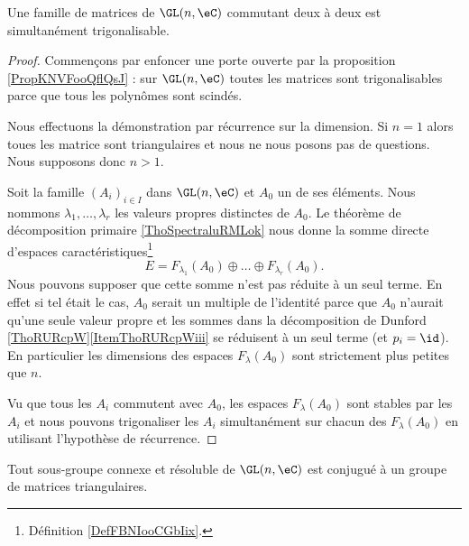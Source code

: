 \begin{lemma}   \label{LemSLGPooIghEPI}
    Une famille de matrices de \( \GL(n,\eC)\) commutant deux à deux est simultanément trigonalisable.
\end{lemma}

\begin{proof}
    Commençons par enfoncer une porte ouverte par la proposition \ref{PropKNVFooQflQsJ} : sur \( \GL(n,\eC)\) toutes les matrices sont trigonalisables parce que tous les polynômes sont scindés.

    Nous effectuons la démonstration par récurrence sur la dimension. Si \( n=1\) alors toues les matrice sont triangulaires et nous ne nous posons pas de questions. Nous supposons donc \( n>1\).

    Soit la famille \( (A_i)_{i\in I}\) dans \( \GL(n,\eC)\) et \( A_0\) un de ses éléments. Nous nommons \( \lambda_1,\ldots, \lambda_r\) les valeurs propres distinctes de \( A_0\). Le théorème de décomposition primaire \ref{ThoSpectraluRMLok} nous donne la somme directe d'espaces caractéristiques\footnote{Définition \ref{DefFBNIooCGbIix}.}
    \begin{equation}
        E=F_{\lambda_1}(A_0)\oplus\ldots\oplus F_{\lambda_r}(A_0).
    \end{equation}
    Nous pouvons supposer que cette somme n'est pas réduite à un seul terme. En effet si tel était le cas, \( A_0\) serait un multiple de l'identité parce que \( A_0\) n'aurait qu'une seule valeur propre et les sommes dans la décomposition de Dunford \ref{ThoRURcpW}\ref{ItemThoRURcpWiii} se réduisent à un seul terme (et \( p_i=\id\)). En particulier les dimensions des espaces \( F_{\lambda}(A_0)\) sont strictement plus petites que \( n\).

    Vu que tous les \( A_i\) commutent avec \( A_0\), les espaces \( F_{\lambda}(A_0)\) sont stables par les \( A_i\) et nous pouvons trigonaliser les \( A_i\) simultanément sur chacun des \( F_{\lambda}(A_0)\) en utilisant l'hypothèse de récurrence.
\end{proof}

\begin{theorem}  \label{ThoUWQBooCvutTO}
    Tout sous-groupe connexe et résoluble de \( \GL(n,\eC)\) est conjugué à un groupe de matrices triangulaires.
\end{theorem}

